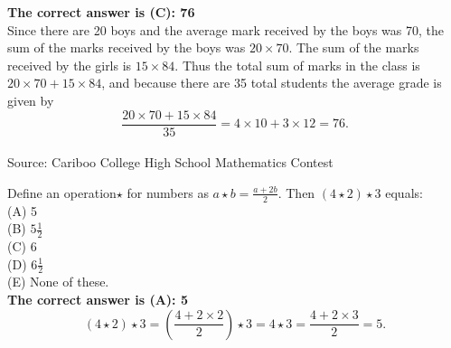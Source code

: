 \documentclass{article}
\begin{document}

\textbf{The correct answer is (C): 76}\\[1 ex]
Since there are 20 boys and the average mark received by the boys was 70, the sum of the marks received by the boys was $20\times70$. The sum of the marks received by the girls is $15\times84$. Thus the total sum of marks in the class is $20\times70+15\times84$, and because there are 35 total students the average grade is given by
\begin{equation*}
\frac{20\times70+15\times84}{35}=4\times10+3\times12=76.
\end{equation*}
\\[5 ex]

\scriptsize
Source: Cariboo College High School Mathematics Contest

\normalsize
Define an operation$\star$ for numbers as $a\star b=\frac{a+2b}{2}.$ Then $(4\star2)\star3$ equals:\\
(A) 5\\
(B) $5\frac{1}{2}$\\
(C) 6\\
(D) $6\frac{1}{2}$\\
(E) None of these.\\


\textbf{The correct answer is (A): 5}\\[1 ex]
\begin{equation*}
(4\star2)\star3=(\frac{4+2\times2}{2})\star3=4\star3=\frac{4+2\times3}{2}=5.
\end{equation*}
\\[5 ex]
\end{document}
